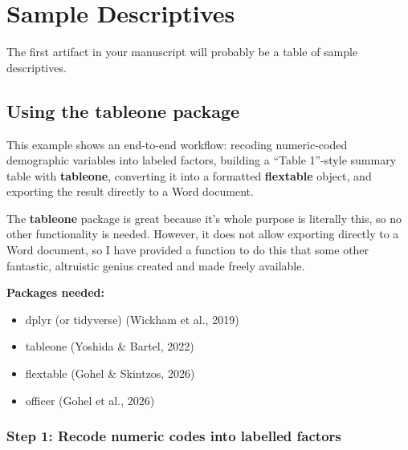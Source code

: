 \documentclass[
  letterpaper,
  DIV=11,
  numbers=noendperiod]{scrreprt}
\begin{document}
\chapter{Sample Descriptives}\label{sample-descriptives}

The first artifact in your manuscript will probably be a table of sample
descriptives.

\section{Using the tableone package}\label{using-the-tableone-package}

This example shows an end-to-end workflow: recoding numeric-coded
demographic variables into labeled factors, building a ``Table 1''-style
summary table with \textbf{tableone}, converting it into a formatted
\textbf{flextable} object, and exporting the result directly to a Word
document.

The \textbf{tableone} package is great because it's whole purpose is
literally this, so no other functionality is needed. However, it does
not allow exporting directly to a Word document, so I have provided a
function to do this that some other fantastic, altruistic genius created
and made freely available.

\textbf{Packages needed:}

\begin{itemize}
\item
  dplyr (or tidyverse) (Wickham et al., 2019)
\item
  tableone (Yoshida \& Bartel, 2022)
\item
  flextable (Gohel \& Skintzos, 2026)
\item
  officer (Gohel et al., 2026)
\end{itemize}

\subsection{Step 1: Recode numeric codes into labelled
factors}\label{step-1-recode-numeric-codes-into-labelled-factors}
\end{document}
